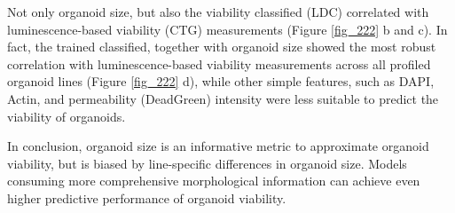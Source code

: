 \begin{flushleft}
\bigbreak
Not only organoid size, but also the viability classified (LDC) correlated with luminescence-based viability (CTG) measurements (Figure \ref{fig_222} b and c). In fact, the trained classified, together with organoid size showed the most robust correlation with luminescence-based viability measurements across all profiled organoid lines (Figure \ref{fig_222} d), while other simple features, such as DAPI, Actin, and permeability (DeadGreen) intensity were less suitable to predict the viability of organoids. 

\bigbreak
In conclusion, organoid size is an informative metric to approximate organoid viability, but is biased by line-specific differences in organoid size. Models consuming more comprehensive morphological information can achieve even higher predictive performance of organoid viability. 


\end{flushleft}
